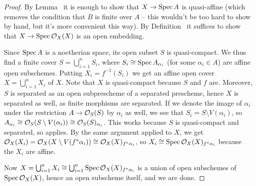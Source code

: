 \documentclass[a4paper,parskip=half,numbers=enddot, DIV=12]{scrreprt}
\renewcommand{\leq}{\leqslant}
\begin{document}
\begin{proof}
	By Lemma~ it is enough to show that $X\morphism\Spec A$ is quasi-affine (which removes the condition that $B$ is finite over $A$ -- this wouldn't be too hard to show by hand, but it's more convenient this way). By Definition~ it suffices to show that $X\morphism\Spec\Oo_X(X)$ is an open embedding.
	
	Since $\operatorname{Spec} A$ is a noetherian space, its open subset $S$ is quasi-compact. We thus find a finite cover $S=\bigcup_{i=1}^n S_i$, where $S_i\cong \operatorname{Spec} A_{\alpha_i}$ (for some $\alpha_i\in A$) are affine open subschemes. Putting $X_i=f^{-1}(S_i)$ we get an affine open cover $X=\bigcup_{i=1}^nX_i$ of $X$. %
	Note that $X$ is quasi-compact because $S$ and $f$ are. Moreover, $S$ is separated as an open subprescheme of a separated prescheme, hence $X$ is separated as well, as finite morphisms are separated. If we denote the image of $\alpha_i$ under the restriction $A\morphism \Oo_S(S)$ by $\alpha_i$ as well, we see that $S_i=S\setminus V(\alpha_i)$, so $A_{\alpha_i}\cong \mathcal{O}_S(S\setminus V(\alpha_i))\cong \mathcal{O}_S(S)_{\alpha_i}$. This works because $S$ is quasi-compact and separated, so \cite[Proposition~1.5.1]{alggeo1} applies. By the same argument applied to $X$, we get $\mathcal{O}_X(X_i)=\mathcal{O}_X(X\setminus V(f^*\alpha_i))\cong \mathcal{O}_X(X)_{f^*\alpha_i}$, so $X_i\cong \operatorname{Spec} \mathcal{O}_X(X)_{f^*\alpha_i}$ because the $X_i$ are affine.
	
	Now $X=\bigcup_{i=1}^nX_i\cong \bigcup_{i=1}^n\operatorname{Spec} \mathcal{O}_X(X)_{f^*\alpha_i}$ is a union of open subschemes of $\operatorname{Spec} \mathcal{O}_X(X)$, hence an open subscheme itself, and we are done.
\end{proof}
\end{document}
